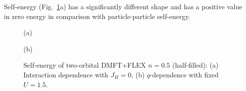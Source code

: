 Self-energy (Fig.~\ref{fig:2_orb_Sigma_FLEX_mu0_eq}a) has a significantly different shape and has a positive value in zero energy in comparison with particle-particle self-energy. 
\begin{figure}[h!]
\begin{minipage}[h]{0.5\linewidth}
 (a) \\
\end{minipage}
\hfill
\begin{minipage}[h]{0.5\linewidth}
 (b) \\
\end{minipage}
\caption{Self-energy of two-orbital DMFT+FLEX $n=0.5$ (half-filled): (a) Interaction dependence with $J_{H}=0$, (b) $q$-dependence with fixed $U=1.5$.}
\label{fig:2_orb_Sigma_FLEX_mu0_eq}
\end{figure}

